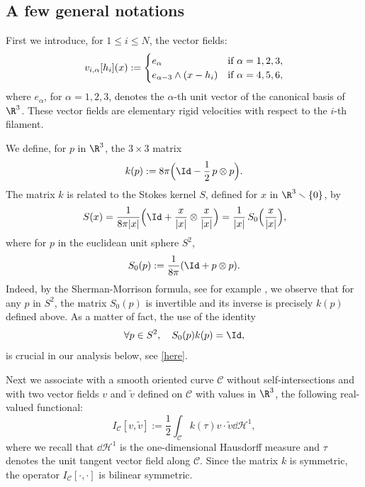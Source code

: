 \subsection{A few general notations}
\label{sec-gn}

First we introduce, for $1 \leq i \leq N$,
the vector fields:
\begin{equation} \label{t1.6}
v_{i,\alpha}{[h_i]} (x) := \begin{cases}
e_\alpha & \text{if} \ \alpha =1,2,3,\\ \relax
e_{\alpha-3} \wedge (x - h_i) & \text{if} \ \alpha=4,5,6,
\end{cases}
\end{equation}
where $e_\alpha $, for $\alpha=1,2,3$, denotes the $\alpha$-th unit vector of the canonical basis of $ \R^{3}$.
These vector fields are elementary rigid velocities with respect to the $i$-th filament.

We define, for $p$ in $\R^3$, the $3 \times 3$ matrix
\begin{equation} \label{ki}
k(p) := 8\pi\Bigl(\Id - \frac12\, p \otimes p\Bigr).
\end{equation}
The matrix $k$ is related to the Stokes kernel $S$, defined for $x$ in $\R^3 \smallsetminus \{ 0 \}$, by
\begin{equation}\label{e.defS}
S(x) = \frac 1 {8 \pi |x|} \Bigl(\Id + \frac x {|x|} \otimes \frac x {|x|} \Bigr)
= \frac 1 {|x|}\, S_0\Bigl(\frac x {|x|} \Bigr),
\end{equation}
where
for $p$ in the euclidean unit sphere $S^2$,
\begin{equation}
\label{notsu}
S_0(p) := \frac 1 {8 \pi}(\Id + p \otimes p).
\end{equation}
Indeed, by the Sherman-Morrison formula, see for example \cite[Prop.\,3.21]{serre}, we observe that
for any $p$ in $S^2 $, the matrix $S_0(p)$ is invertible and its inverse is precisely $k(p)$ defined above.
As a matter of fact, the use of the identity
\begin{equation} \label{eqqe}
\forall p\in S^2, \quad S_0(p) k(p) = \Id,
\end{equation}
is crucial in our analysis below, see \eqref{here}.

Next we associate with a smooth oriented curve $\mathcal{C}$ without self-intersections and with two vector fields $ v$ and $\tilde v$ defined on $\mathcal{C}$ with values in $\R^3$, the following real-valued functional:
\begin{equation}
\label{lau}
I_{\mathcal C} [v,\tilde{v}] := \frac12
\int_{\mathcal{C}} k(\tau) v \cdot \tilde{v} \dd \mathcal{H}^1,
\end{equation}
where we recall that $\dd \mathcal{H}^1$ is the one-dimensional Hausdorff measure and $\tau$ denotes the unit tangent vector field along $\mathcal{C}$. Since the matrix $k$ is symmetric, the operator $I_{\mathcal C} [\cdot,\cdot]$ is bilinear symmetric.

